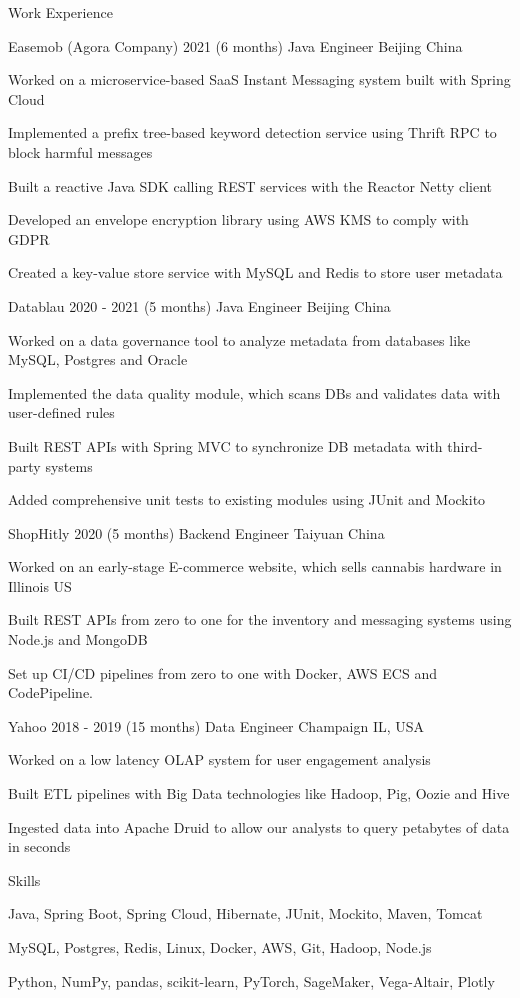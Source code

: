 \documentclass{resume} %
\begin{document}
\begin{rSection}{Work Experience}

\begin{rSubsection}
{Easemob (Agora Company)} {2021 (6 months)} {Java Engineer} {Beijing China}
\item Worked on a microservice-based SaaS Instant Messaging system built with Spring Cloud
\item Implemented a prefix tree-based keyword detection service using Thrift RPC to block harmful messages
\item Built a reactive Java SDK calling REST services with the Reactor Netty client
\item Developed an envelope encryption library using AWS KMS to comply with GDPR
\item Created a key-value store service with MySQL and Redis to store user metadata
\end{rSubsection}

\begin{rSubsection}
{Datablau} {2020 - 2021 (5 months)} {Java Engineer} {Beijing China}
\item Worked on a data governance tool to analyze metadata from databases like MySQL, Postgres and Oracle
\item Implemented the data quality module, which scans DBs and validates data with user-defined rules
\item Built REST APIs with Spring MVC to synchronize DB metadata with third-party systems
\item Added comprehensive unit tests to existing modules using JUnit and Mockito
\end{rSubsection}

\begin{rSubsection}
{ShopHitly} {2020 (5 months)} {Backend Engineer} {Taiyuan China}
\item Worked on an early-stage E-commerce website, which sells cannabis hardware in Illinois US
\item Built REST APIs from zero to one for the inventory and messaging systems using Node.js and MongoDB
\item Set up CI/CD pipelines from zero to one with Docker, AWS ECS and CodePipeline.
\end{rSubsection}

\begin{rSubsection}
{Yahoo} {2018 - 2019 (15 months)} {Data Engineer} {Champaign IL, USA}
\item Worked on a low latency OLAP system for user engagement analysis
\item Built ETL pipelines with Big Data technologies like Hadoop, Pig, Oozie and Hive
\item Ingested data into Apache Druid to allow our analysts to query petabytes of data in seconds
\end{rSubsection}

\end{rSection}

\begin{skillSection}{Skills}
\item Java, Spring Boot, Spring Cloud, Hibernate, JUnit, Mockito, Maven, Tomcat
\item MySQL, Postgres, Redis, Linux, Docker, AWS, Git, Hadoop, Node.js
\item Python, NumPy, pandas, scikit-learn, PyTorch, SageMaker, Vega-Altair, Plotly
\end{skillSection}
\end{document}
